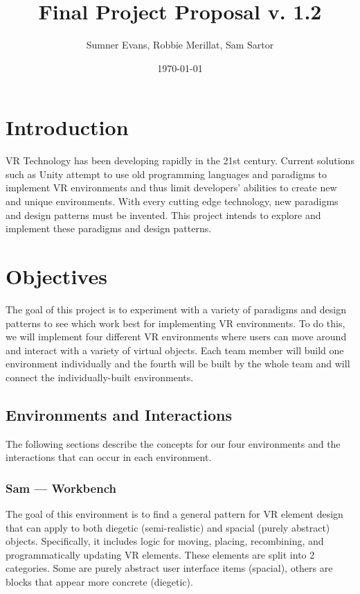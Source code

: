 \documentclass[titlepage,12pt]{article}
\title{Final Project Proposal v. 1.2}
\author{Sumner Evans, Robbie Merillat, Sam Sartor}
\date{\today}
\begin{document}
\maketitle

\section{Introduction} 

VR Technology has been developing rapidly in the 21st century. Current solutions
such as Unity attempt to use old programming languages and paradigms to
implement VR environments and thus limit developers' abilities to create new and
unique environments. With every cutting edge technology, new paradigms and
design patterns must be invented. This project intends to explore and implement
these paradigms and design patterns.

\section{Objectives}

The goal of this project is to experiment with a variety of paradigms and design
patterns to see which work best for implementing VR environments. To do this, we
will implement four different VR environments where users can move around and
interact with a variety of virtual objects. Each team member will build one
environment individually and the fourth will be built by the whole team and will
connect the individually-built environments.

\subsection{Environments and Interactions}
The following sections describe the concepts for our four environments and the
interactions that can occur in each environment.


\subsubsection{Sam --- Workbench} The goal of this environment is to find a
general pattern for VR element design that can apply to both diegetic
(semi-realistic) and spacial (purely abstract) objects. Specifically, it
includes logic for moving, placing, recombining, and programmatically updating
VR elements. These elements are split into 2 categories. Some are purely
abstract user interface items (spacial), others are blocks that appear more
concrete (diegetic).
\end{document}
